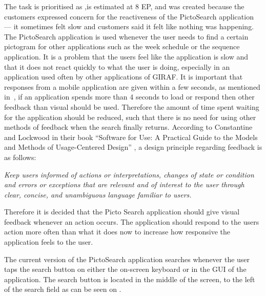 \begin{center}
\end{center}

The task is prioritised as \phigh,is estimated at 8 EP, and was created because the customers expressed concern for the reactiveness of the PictoSearch application --- it sometimes felt slow and customers said it felt like nothing was happening.
The PictoSearch application is used whenever the user needs to find a certain pictogram for other applications such as the week schedule or the sequence application.
It is a problem that the users feel like the application is slow and that it does not react quickly to what the user is doing, especially in an application used often by other applications of GIRAF.
It is important that responses from a mobile application are given within a few seconds, as mentioned in~\cite{Roto:2005:NNF:1062745.1062747}, if an application spends more than 4 seconds to load or respond then other feedback than visual should be used.
Therefore the amount of time spent waiting for the application should be reduced, such that there is no need for using other methods of feedback when the search finally returns.
According to Constantine and Lockwood in their book \enquote{Software for Use: A Practical Guide to the Models and Methods of Usage-Centered Design} \cite{DESIGNBOOK}, a design principle regarding feedback is as follows:

\begin{displayquote}
\textit{Keep users informed of actions or interpretations, changes of state or condition and errors or exceptions that are relevant and of interest to the user through clear, concise, and unambiguous language familiar to users\cite[p.~57]{DESIGNBOOK}.}
\end{displayquote}

Therefore it is decided that the Picto Search application should give visual feedback whenever an action occurs.
The application should respond to the users action more often than what it does now to increase how responsive the application feels to the user.

The current version of the PictoSearch application searches whenever the user taps the search button on either the on-screen keyboard or in the GUI of the application.
The search button is located in the middle of the screen, to the left of the search field as can be seen on .

